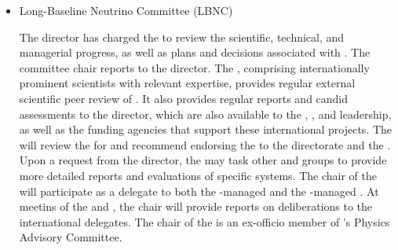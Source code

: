 \begin{itemize}

\item Long-Baseline Neutrino Committee (LBNC)

The  director has charged the  to review the scientific, technical, and managerial progress, as well as plans and decisions associated with . The committee chair reports to the  director. 
The  , comprising internationally prominent scientists with relevant expertise, 
provides regular external scientific peer review of . It also provides regular reports and candid assessments to the  director, which are also available to the , , and  leadership, as well as the funding agencies that support these international projects. The   will review the  for  and recommend endorsing the   to the  directorate and the . Upon a request from the  director, the   may task other  and  groups to provide more detailed reports and evaluations of specific systems. The chair of the   will participate as a delegate to both the -managed  and the -managed . At meetins of the  and , the  chair will provide reports on   deliberations to the international delegates. The chair of the   is an ex-officio member of  's Physics Advisory Committee.



\end{itemize}
